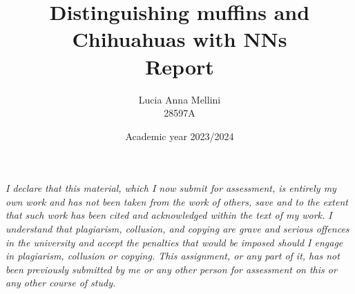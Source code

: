 \documentclass{article}
\begin{document}
\title{\huge{Distinguishing muffins and Chihuahuas with NNs}\\
\Large Report}
\author{Lucia Anna Mellini \\
 28597A}
\date{Academic year 2023/2024}
\maketitle

\tableofcontents
\bigskip
\bigskip
\bigskip
\small \textit{I declare that this material, which I now submit for assessment, is entirely my own work and has not been taken from the work of others, save and to the extent that such work has been cited and acknowledged within the text of my work. I understand that plagiarism, collusion, and copying are grave and serious offences in the university and accept the penalties that would be imposed should I engage in plagiarism, collusion or copying. This assignment, or any part of it, has not been previously submitted by me or any other person for assessment on this or any other course of study.}








\end{document}
